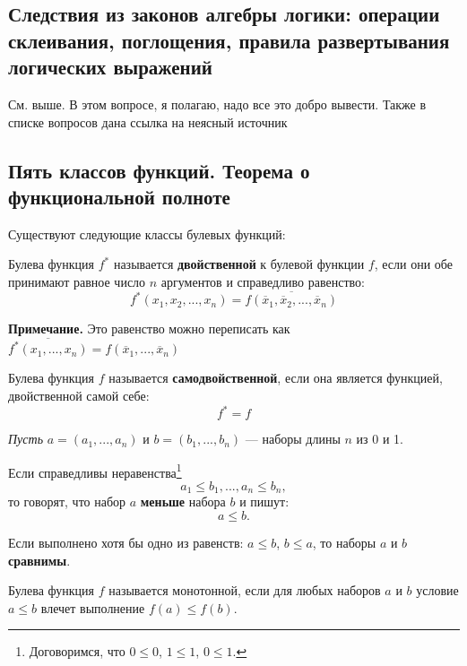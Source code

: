 \documentclass[14pt, a4paper]{extarticle}
\begin{document}
\subsection{Следствия из законов алгебры логики: операции склеивания, поглощения, правила развертывания логических выражений}
См. выше. В этом вопросе, я полагаю, надо все это добро вывести. Также в списке вопросов дана ссылка на неясный источник
\subsection{Пять классов функций. Теорема о функциональной полноте}
Существуют следующие классы булевых функций:
\begin{itemize}
  \begin{defin}
  Булева функция $f^*$ называется \textbf{двойственной} к булевой функции $f$, если они обе принимают равное число $n$ аргументов и справедливо равенство:
  $$f^*(x_1, x_2, ..., x_n) = \overline{f(\overline x_1, \overline x_2, ..., \overline x_n)}$$
  \end{defin}

  {\small \textbf{Примечание.} Это равенство можно переписать как \newline
  $\overline{f^*(x_1, ..., x_n)} = f(\overline x_1, ..., \overline x_n)$}
  
  \begin{defin}
    Булева функция $f$ называется \textbf{самодвойственной}, если она является функцией, двойственной самой себе:
    $$ f^* = f $$
  \end{defin}

  \textit{Пусть} $ a = (a_1, ..., a_n) $ и $ b = (b_1, ..., b_n) $ --- наборы длины $n$ из 0 и 1.
  \begin{defin}
    Если справедливы неравенства\footnote{Договоримся, что $0 \le 0$, $1 \le 1$, $0 \le 1$.} $$a_1 \le b_1, ..., a_n \le b_n,$$
    то говорят, что набор $a$ \textbf{меньше} набора $b$ и пишут: $$ a \le b. $$
  \end{defin}
  \begin{defin}
  Если выполнено хотя бы одно из равенств: $a \le b$, $b \le a$, то наборы $a$ и $b$ \textbf{сравнимы}.
  \end{defin}
  \begin{defin}
    Булева функция $f$ называется монотонной, если для любых наборов $a$ и $b$ условие $a \le b$ влечет выполнение $f(a) \le f(b)$.
  \end{defin}


\end{itemize}
\end{document}
